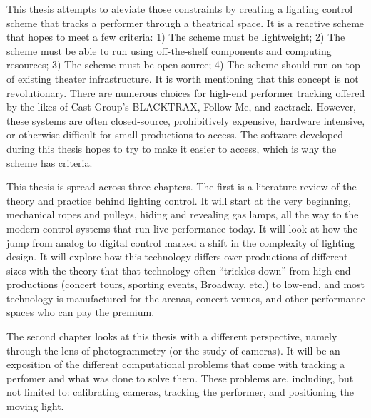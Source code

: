 \documentclass[12pt,twoside]{reedthesis}
\begin{document}

    This thesis attempts to aleviate those constraints by creating a lighting control scheme that tracks a performer through a theatrical space. It is a reactive scheme that hopes to meet a few criteria: 1) The scheme must be lightweight; 2) The scheme must be able to run using off-the-shelf components and computing resources; 3) The scheme must be open source; 4) The scheme should run on top of existing theater infrastructure. It is worth mentioning that this concept is not revolutionary. There are numerous choices for high-end performer tracking offered by the likes of Cast Group's BLACKTRAX, Follow-Me, and zactrack. However, these systems are often closed-source, prohibitively expensive, hardware intensive, or otherwise difficult for small productions to access. The software developed during this thesis hopes to try to make it easier to access, which is why the scheme has criteria. 
    
    
    This thesis is spread across three chapters. The first is a literature review of the theory and practice behind lighting control. It will start at the very beginning, mechanical ropes and pulleys, hiding and revealing gas lamps, all the way to the modern control systems that run live performance today. It will look at how the jump from analog to digital control marked a shift in the complexity of lighting design. It will explore how this technology differs over productions of different sizes with the theory that that technology often “trickles down” from high-end productions (concert tours, sporting events, Broadway, etc.) to low-end, and most technology is manufactured for the arenas, concert venues, and other performance spaces who can pay the premium.
    
    
    The second chapter looks at this thesis with a different perspective, namely through the lens of photogrammetry (or the study of cameras). It will be an exposition of the different computational problems that come with tracking a perfomer and what was done to solve them. These problems are, including, but not limited to: calibrating cameras, tracking the performer, and positioning the moving light.
    
\end{document}
